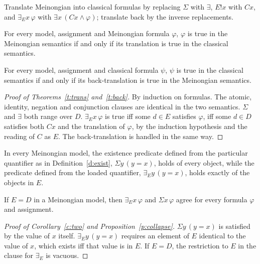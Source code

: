 \documentclass{situationist-preprint}
\begin{document}
Translate Meinongian into classical formulas by replacing $\Sigma$ with $\exists$, $E!x$ with $Cx$, and $\exists_E x\, \varphi$ with $\exists x\, (Cx \wedge \varphi)$; translate back by the inverse replacements.

\begin{theorem}[Translation]\label{t:trans}
For every model, assignment and Meinongian formula $\varphi$, $\varphi$ is true in the Meinongian semantics if and only if its translation is true in the classical semantics.
\end{theorem}

\begin{theorem}\label{t:back}
For every model, assignment and classical formula $\psi$, $\psi$ is true in the classical semantics if and only if its back-translation is true in the Meinongian semantics.
\end{theorem}

\begin{proof}[Proof of Theorems~\ref{t:trans} and~\ref{t:back}]
By induction on formulas. The atomic, identity, negation and conjunction clauses are identical in the two semantics. $\Sigma$ and $\exists$ both range over $D$. $\exists_E x\, \varphi$ is true iff some $d \in E$ satisfies $\varphi$, iff some $d \in D$ satisfies both $Cx$ and the translation of $\varphi$, by the induction hypothesis and the reading of $C$ as $E$. The back-translation is handled in the same way.
\end{proof}

\begin{corollary}\label{c:two}
In every Meinongian model, the existence predicate defined from the particular quantifier as in Definition~\ref{d:exist}, $\Sigma y\,(y = x)$, holds of every object, while the predicate defined from the loaded quantifier, $\exists_E y\,(y = x)$, holds exactly of the objects in $E$.
\end{corollary}

\begin{proposition}[Collapse]\label{p:collapse}
If $E = D$ in a Meinongian model, then $\exists_E x\, \varphi$ and $\Sigma x\, \varphi$ agree for every formula $\varphi$ and assignment.
\end{proposition}

\begin{proof}[Proof of Corollary~\ref{c:two} and Proposition~\ref{p:collapse}]
$\Sigma y\,(y = x)$ is satisfied by the value of $x$ itself. $\exists_E y\,(y = x)$ requires an element of $E$ identical to the value of $x$, which exists iff that value is in $E$. If $E = D$, the restriction to $E$ in the clause for $\exists_E$ is vacuous.
\end{proof}
\end{document}
